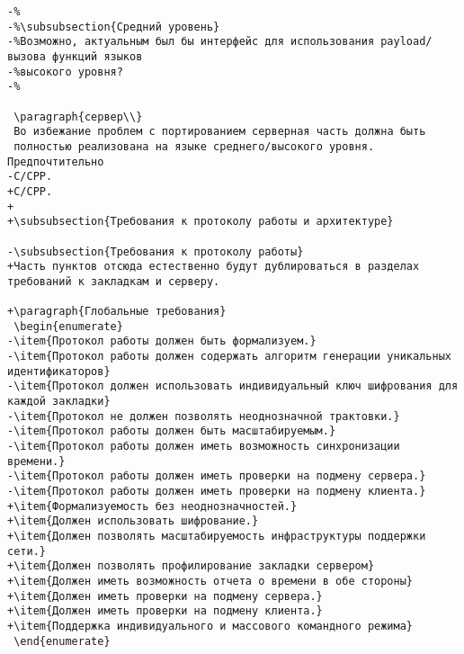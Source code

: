 \begin{verbatim}
-%
-%\subsubsection{Средний уровень}
-%Возможно, актуальным был бы интерфейс для использования payload/вызова функций языков
-%высокого уровня?
-%

 \paragraph{сервер\\}
 Во избежание проблем с портированием серверная часть должна быть
 полностью реализована на языке среднего/высокого уровня. Предпочтительно
-C/CPP.
+C/CPP.
+
+\subsubsection{Требования к протоколу работы и архитектуре}

-\subsubsection{Требования к протоколу работы}
+Часть пунктов отсюда естественно будут дублироваться в разделах требований к закладкам и серверу.

+\paragraph{Глобальные требования}
 \begin{enumerate}
-\item{Протокол работы должен быть формализуем.}
-\item{Протокол работы должен содержать алгоритм генерации уникальных идентификаторов}
-\item{Протокол должен использовать индивидуальный ключ шифрования для каждой закладки}
-\item{Протокол не должен позволять неоднозначной трактовки.}
-\item{Протокол работы должен быть масштабируемым.}
-\item{Протокол работы должен иметь возможность синхронизации времени.}
-\item{Протокол работы должен иметь проверки на подмену сервера.}
-\item{Протокол работы должен иметь проверки на подмену клиента.}
+\item{Формализуемость без неоднозначностей.}
+\item{Должен использовать шифрование.}
+\item{Должен позволять масштабируемость инфраструктуры поддержки сети.}
+\item{Должен позволять профилирование закладки сервером}
+\item{Должен иметь возможность отчета о времени в обе стороны}
+\item{Должен иметь проверки на подмену сервера.}
+\item{Должен иметь проверки на подмену клиента.}
+\item{Поддержка индивидуального и массового командного режима}
 \end{enumerate}


\end{verbatim}
